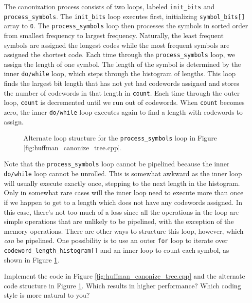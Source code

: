 The canonization process consists of two loops, labeled \lstinline{init_bits} and \lstinline{process_symbols}.  The \lstinline{init_bits} loop executes first, initializing \lstinline{symbol_bits[]} array to \lstinline{0}. The \lstinline{process_symbols} loop then processes the symbols in sorted order from smallest frequency to largest frequency. Naturally, the least frequent symbols are assigned the longest codes while the most frequent symbols are assigned the shortest code.  Each time through the \lstinline{process_symbols} loop, we assign the length of one symbol.  The length of the symbol is determined by the inner \lstinline{do/while} loop, which steps through the histogram of lengths. This loop finds the largest bit length that has not yet had codewords assigned and stores the number of codewords in that length in \lstinline{count}. Each time through the outer loop, \lstinline{count} is decremented until we run out of codewords.  When \lstinline{count} becomes zero, the inner \lstinline{do/while} loop executes again to find a length with codewords to assign.

\begin{figure}

\caption{ Alternate loop structure for the \lstinline{process_symbols} loop in Figure \ref{fig:huffman_canonize_tree.cpp}. }
\label{fig:huffman_canonize_alternate}
\end{figure}

Note that the \lstinline{process_symbols} loop cannot be pipelined because the inner \lstinline{do/while} loop cannot be unrolled.  This is somewhat awkward as the inner loop will usually execute exactly once, stepping to the next length in the histogram.  Only in somewhat rare cases will the inner loop need to execute more than once if we happen to get to a length which does not have any codewords assigned.  In this case, there's not too much of a loss since all the operations in the loop are simple operations that are unlikely to be pipelined, with the exception of the memory operations.  There are other ways to structure this loop, however, which {\em can} be pipelined.  One possibility is to use an outer \lstinline{for} loop to iterate over \lstinline{codeword_length_histogram[]} and an inner loop to count each symbol, as shown in Figure \ref{fig:huffman_canonize_alternate}.

\begin{exercise}
Implement the code in Figure \ref{fig:huffman_canonize_tree.cpp} and the alternate code structure in Figure \ref{fig:huffman_canonize_alternate}.  Which results in higher performance?  Which coding style is more natural to you?
\end{exercise}

